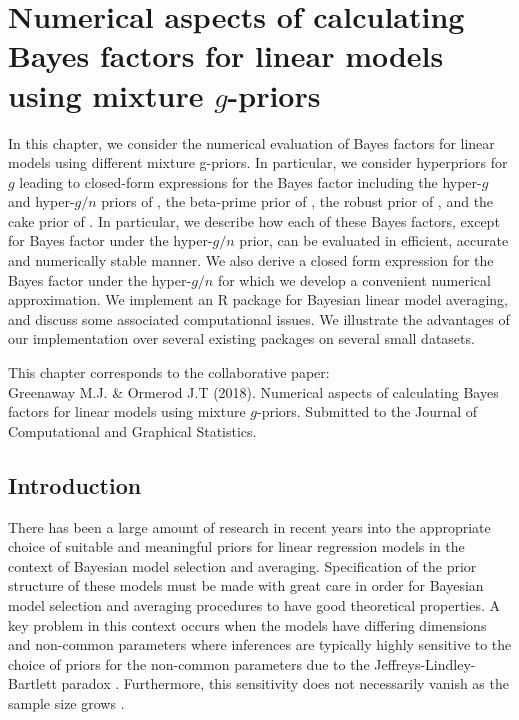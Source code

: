 
\chapter{Numerical aspects of calculating Bayes factors for linear models using
	mixture $g$-priors
	}



\noindent
In this chapter, we consider the numerical evaluation of Bayes factors for
linear models using different mixture g-priors. In particular, we consider
hyperpriors for $g$ leading to closed-form expressions for the Bayes factor
including the hyper-$g$ and hyper-$g/n$ priors of \cite{Liang2008}, the
beta-prime prior of \cite{Maruyama2011}, the robust prior of
\cite{Bayarri2012}, and the cake prior of \cite{OrmerodEtal2017}. In
particular, we describe how each of these Bayes factors, except for Bayes
factor under the hyper-$g/n$ prior, can be evaluated in efficient, accurate and
numerically stable manner. We also derive a closed form expression for the
Bayes factor under the hyper-$g/n$ for which we develop a convenient numerical
approximation. We implement an R package for Bayesian linear model averaging,
and discuss some associated computational issues. We illustrate the advantages
of our implementation over several existing packages on several small datasets.


\vfill
{\footnotesize
\noindent	
	This chapter corresponds to the collaborative paper: \\
	Greenaway M.J. \& Ormerod J.T (2018).
	Numerical aspects of calculating Bayes factors for linear models using mixture $g$-priors. Submitted to the Journal of Computational and Graphical Statistics.
}

\newpage 

 
\section{Introduction}

 
There has been a large amount of research in recent years into the appropriate
choice of suitable and meaningful priors for linear regression models in the
context of Bayesian model selection and averaging. Specification of the prior
structure of these models must be made with great care in order for Bayesian
model selection and averaging procedures to have good theoretical properties.
A key problem in this context occurs when the models have differing dimensions
and non-common parameters where inferences are typically highly sensitive to
the choice of priors for the non-common parameters due to the
Jeffreys-Lindley-Bartlett paradox
\citep{Lindley1957,Bartlett1957,OrmerodEtal2017}.  Furthermore, this
sensitivity does not necessarily vanish as the sample size grows
\citep{Kass1995,Berger2001}.  

